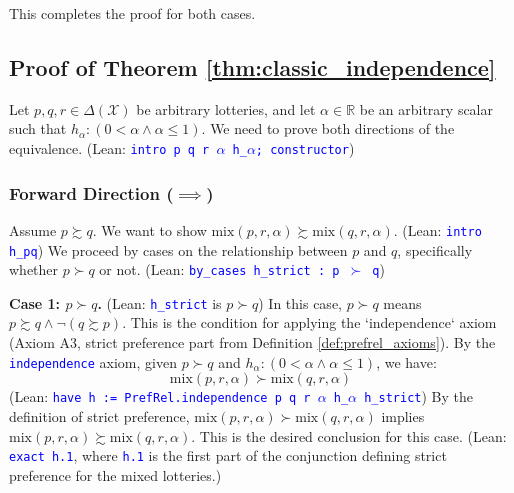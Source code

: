 \documentclass{article}
\theoremstyle{definition}
\newcommand{\R}{\mathbb{R}}
\newcommand{\X}{\mathcal{X}}
\newcommand{\tactic}[1]{\textcolor{blue}{\texttt{#1}}}
\newcommand{\DeltaX}{\Delta(\X)} %
\newcommand{\pref}{\succsim} %
\newcommand{\strictpref}{\succ} %
\newcommand{\mix}{\mathrm{mix}} %
\begin{document}
This completes the proof for both cases.

\subsection{Proof of Theorem \ref{thm:classic_independence}}\label{proof:thm:classic_independence}
Let $p, q, r \in \DeltaX$ be arbitrary lotteries, and let $\alpha \in \R$ be an arbitrary scalar such that $h_\alpha: (0 < \alpha \land \alpha \le 1)$.
We need to prove both directions of the equivalence.
(Lean: \tactic{intro p q r $\alpha$ h\_$\alpha$; constructor})

\subsubsection{Forward Direction ($\implies$)}
Assume $p \pref q$. We want to show $\mix(p, r, \alpha) \pref \mix(q, r, \alpha)$.
(Lean: \tactic{intro h\_pq})
We proceed by cases on the relationship between $p$ and $q$, specifically whether $p \strictpref q$ or not.
(Lean: \tactic{by\_cases h\_strict : p $\succ$ q})

\textbf{Case 1: $p \strictpref q$.}
(Lean: \tactic{h\_strict} is $p \succ q$)
In this case, $p \strictpref q$ means $p \pref q \land \lnot(q \pref p)$. This is the condition for applying the `independence` axiom (Axiom A3, strict preference part from Definition \ref{def:prefrel_axioms}).
By the \tactic{independence} axiom, given $p \strictpref q$ and $h_\alpha:(0 < \alpha \land \alpha \le 1)$, we have:
\[ \mix(p, r, \alpha) \strictpref \mix(q, r, \alpha) \]
(Lean: \tactic{have h := PrefRel.independence p q r $\alpha$ h\_$\alpha$ h\_strict})
By the definition of strict preference, $\mix(p, r, \alpha) \strictpref \mix(q, r, \alpha)$ implies $\mix(p, r, \alpha) \pref \mix(q, r, \alpha)$.
This is the desired conclusion for this case.
(Lean: \tactic{exact h.1}, where \tactic{h.1} is the first part of the conjunction defining strict preference for the mixed lotteries.)
\end{document}
